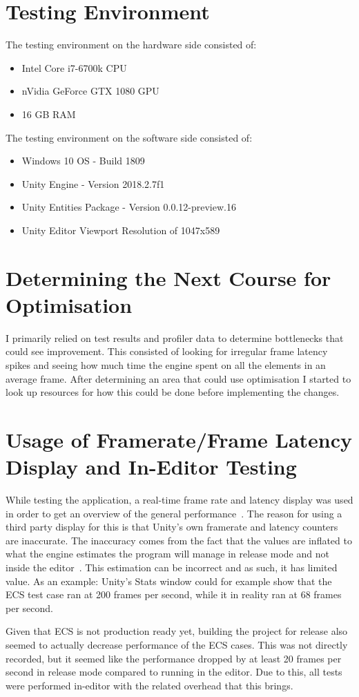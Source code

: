 \section{Testing Environment}
The testing environment on the hardware side consisted of:
\begin{itemize}
    \item Intel Core i7-6700k CPU
    \item nVidia GeForce GTX 1080 GPU
    \item 16 GB RAM
\end{itemize}
The testing environment on the software side consisted of:
\begin{itemize}
    \item Windows 10 OS - Build 1809
    \item Unity Engine - Version 2018.2.7f1
    \item Unity Entities Package - Version 0.0.12-preview.16
    \item Unity Editor Viewport Resolution of 1047x589
\end{itemize}

\section{Determining the Next Course for Optimisation}
I primarily relied on test results and profiler data to determine bottlenecks that could see improvement. This consisted of looking for irregular frame latency spikes and seeing how much time the engine spent on all the elements in an average frame. After determining an area that could use optimisation I started to look up resources for how this could be done before implementing the changes. 

\section{Usage of Framerate/Frame Latency Display and In-Editor Testing}
While testing the application, a real-time frame rate and latency display was used in order to get an overview of the general performance~\cite{graphy}. The reason for using a third party display for this is that Unity's own framerate and latency counters are inaccurate. The inaccuracy comes from the fact that the values are inflated to what the engine estimates the program will manage in release mode and not inside the editor~\cite{forumFramerateStats}. This estimation can be incorrect and as such, it has limited value. As an example: Unity's Stats window could for example show that the ECS test case ran at 200 frames per second, while it in reality ran at 68 frames per second. 

Given that ECS is not production ready yet, building the project for release also seemed to actually decrease performance of the ECS cases. This was not directly recorded, but it seemed like the performance dropped by at least 20 frames per second in release mode compared to running in the editor. Due to this, all tests were performed in-editor with the related overhead that this brings. 
